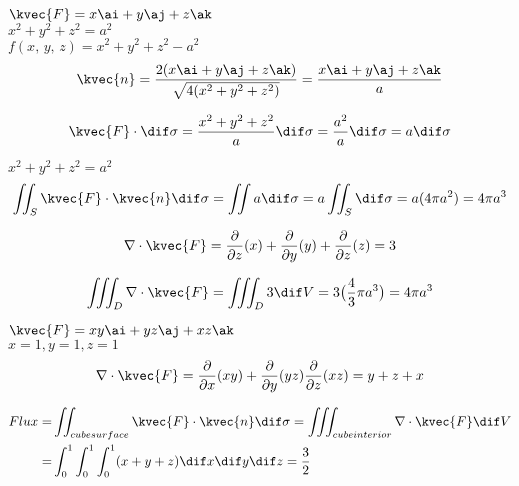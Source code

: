 \( \kvec{F} =x\ai + y\aj +z\ak \) \\
\( x^2 + y^2 +z^2 = a^2 \) \\

\( f(x, \, y, \, z) = x^2 + y^2 +z^2 -a^2 \) \\

\begin{align*}
\kvec{n} = \frac{2(x\ai + y\aj +z\ak)}{\sqrt{4(x^2 + y^2 +z^2)}} = \frac{x\ai +y\aj +z\ak}{a}
\end{align*}

\begin{align*}
\kvec{F} \cdot \dif \sigma = \frac{x^2 +y^2 + z^2 }{a} \dif \sigma = \frac{a^2}{a} \dif \sigma = a \dif \sigma 
\end{align*}

\( x^2 + y^2 +z^2 = a^2 \) \\

\begin{align*}
\iint_S \kvec{F} \cdot \kvec{n} \dif \sigma = \iint a \dif \sigma = a \iint_S \dif \sigma = a(4 \pi a^2 ) = 4 \pi a^3 
\end{align*}

\begin{align*}
\nabla \cdot \kvec{F} = \frac{\partial}{\partial z} (x) + \frac{\partial}{\partial y} (y) + \frac{\partial}{\partial z} (z) = 3
\end{align*}

\begin{align*}
\iiint_D \nabla \cdot \kvec{F} = \iiint_D 3\dif V = 3 \big( \frac{4}{3} \pi a^3 \big) = 4 \pi a^3 
\end{align*}

\( \kvec{F} = xy\ai + yz\aj +xz\ak \) \\
\( x=1, y=1, z=1 \) \\

\begin{align*}
\nabla \cdot \kvec{F} = \frac{\partial}{\partial x}(xy) + \frac{\partial}{\partial y} (yz) \frac{\partial}{\partial z} ( xz) = y+z+x
\end{align*} 

\begin{align*}
Flux =& \iint_{ cube  surface} \kvec{F} \cdot \kvec{n} \dif \sigma = \iiint_{cube  interior} \nabla \cdot \kvec{F} \dif V \\
=& \int_{0}^{1} \int_{0}^{1} \int_{0}^{1} (x+y+z) \dif x \dif y \dif z = \frac{3}{2}
\end{align*}

